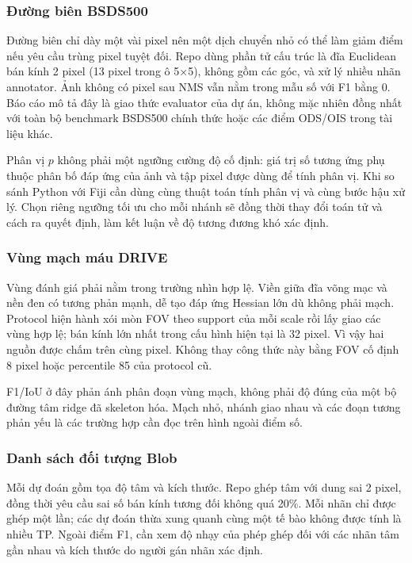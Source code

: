 \subsubsection{Đường biên BSDS500}
Đường biên chỉ dày một vài pixel nên một dịch chuyển nhỏ có thể làm giảm điểm nếu yêu cầu trùng pixel tuyệt đối. Repo dùng phần tử cấu trúc là đĩa Euclidean bán kính 2 pixel (13 pixel trong ô 5$\times$5), không gồm các góc, và xử lý nhiều nhãn annotator. Ảnh không có pixel sau NMS vẫn nằm trong mẫu số với F1 bằng 0. Báo cáo mô tả đây là giao thức evaluator của dự án, không mặc nhiên đồng nhất với toàn bộ benchmark BSDS500 chính thức hoặc các điểm ODS/OIS trong tài liệu khác.

Phân vị $p$ không phải một ngưỡng cường độ cố định: giá trị số tương ứng phụ thuộc phân bố đáp ứng của ảnh và tập pixel được dùng để tính phân vị. Khi so sánh Python với Fiji cần dùng cùng thuật toán tính phân vị và cùng bước hậu xử lý. Chọn riêng ngưỡng tối ưu cho mỗi nhánh sẽ đồng thời thay đổi toán tử và cách ra quyết định, làm kết luận về độ tương đương khó xác định.

\subsubsection{Vùng mạch máu DRIVE}
Vùng đánh giá phải nằm trong trường nhìn hợp lệ. Viền giữa đĩa võng mạc và nền đen có tương phản mạnh, dễ tạo đáp ứng Hessian lớn dù không phải mạch. Protocol hiện hành xói mòn FOV theo support của mỗi scale rồi lấy giao các vùng hợp lệ; bán kính lớn nhất trong cấu hình hiện tại là 32 pixel. Vì vậy hai nguồn được chấm trên cùng pixel. Không thay công thức này bằng FOV cố định 8 pixel hoặc percentile 85 của protocol cũ.

F1/IoU ở đây phản ánh phân đoạn vùng mạch, không phải độ đúng của một bộ đường tâm ridge đã skeleton hóa. Mạch nhỏ, nhánh giao nhau và các đoạn tương phản yếu là các trường hợp cần đọc trên hình ngoài điểm số.

\subsubsection{Danh sách đối tượng Blob}
Mỗi dự đoán gồm tọa độ tâm và kích thước. Repo ghép tâm với dung sai 2 pixel, đồng thời yêu cầu sai số bán kính tương đối không quá 20\%. Mỗi nhãn chỉ được ghép một lần; các dự đoán thừa xung quanh cùng một tế bào không được tính là nhiều TP. Ngoài điểm F1, cần xem độ nhạy của phép ghép đối với các nhãn tâm gần nhau và kích thước do người gán nhãn xác định.

